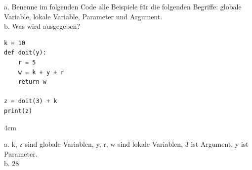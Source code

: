 \question[3]
a. Benenne im folgenden Code alle Beispiele für die folgenden Begriffe: 
globale Variable, lokale Variable, Parameter und Argument. \\
b. Was wird ausgegeben?
\begin{lstlisting}
k = 10       
def doit(y):
    r = 5
    w = k + y + r
    return w

z = doit(3) + k 
print(z)
\end{lstlisting}
\begin{solutionbox}{4cm}
 
a. k, z sind globale Variablen, y, r, w sind lokale Variablen, 3 ist Argument, y ist Parameter. \\
b. 28
 
\end{solutionbox}
